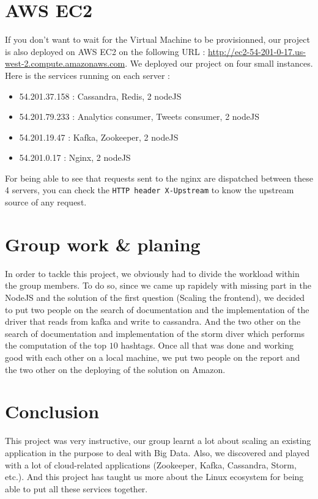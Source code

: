 \documentclass[conference,9pt]{IEEEtran}
\begin{document}
\section{AWS EC2}
If you don't want to wait for the Virtual Machine to be provisionned, our project is also deployed on AWS EC2 on the following URL : \url{http://ec2-54-201-0-17.us-west-2.compute.amazonaws.com}. We deployed our project on four small instances. Here is the services running on each server :
\begin{itemize}
\item 54.201.37.158 : Cassandra, Redis, 2 nodeJS
\item 54.201.79.233 : Analytics consumer, Tweets consumer, 2 nodeJS
\item 54.201.19.47 : Kafka, Zookeeper, 2 nodeJS
\item 54.201.0.17 : Nginx, 2 nodeJS
\end{itemize}
For being able to see that requests sent to the nginx are dispatched between these 4 servers, you can check the \texttt{HTTP header X-Upstream} to know the upstream source of any request.

\section{Group work \& planing}
In order to tackle this project, we obviously had to divide the workload within the group members. To do so, since we came up rapidely with missing part in the NodeJS and the solution of the first question (Scaling the frontend), we decided to put two people on the search of documentation and the implementation of the driver that reads from kafka and write to cassandra. And the two other on the search of documentation and implementation of the storm diver which performs the computation of the top $10$ hashtags. Once all that was done and working good with each other on a local machine, we put two people on the report and the two other on the deploying of the solution on Amazon.
 
\section{Conclusion}
This project was very instructive, our group learnt a lot about scaling an existing application in the purpose to deal with Big Data. Also, we discovered and played with a lot of cloud-related applications (Zookeeper, Kafka, Cassandra, Storm, etc.). And this project has taught us more about the Linux ecosystem for being able to put all these services together.
\end{document}

